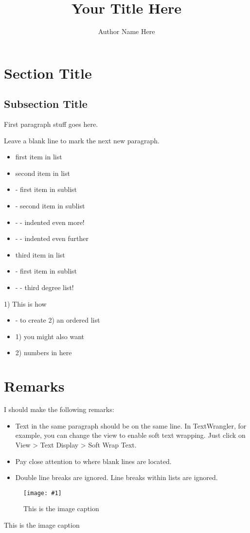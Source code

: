 \documentclass[10pt,a4paper]{article}
\title{Your Title Here}
\author{Author Name Here}
\newlength{\imgwidth}
\newcommand\scalegraphics[1]{%
    \settowidth{\imgwidth}{\texttt{[image: \#1]}}%
    \setlength{\imgwidth}{\minof{\imgwidth}{\textwidth - 75pt}}%
    \texttt{[image: \#1]}%
}
\begin{document}
\maketitle
\newpage

\tableofcontents

\newpage 
 
 

\section{Section Title}
 

\subsection{Subsection Title} 
 

First paragraph stuff goes here.
 

Leave a blank line to mark the next new paragraph.
 

\begin{itemize} 
\item first item in list
\item second item in list
\item - first item in sublist
\item - second item in sublist
\item - - indented even more!
\item - - indented even further
\item third item in list
\item - first item in sublist
\item - - third degree list!
\end{itemize} 

1) This is how
\begin{itemize} 
\item - to create
2) an ordered list
\item 1) you might also want
\item 2) numbers in here
\end{itemize} 

\section{Remarks}
 

I should make the following remarks:
 

\begin{itemize} 
\item Text in the same paragraph should be on the same line. In TextWrangler, for example, you can change the view to enable soft text wrapping. Just click on View > Text Display > Soft Wrap Text.
\item Pay close attention to where blank lines are located.
\item Double line breaks are ignored. Line breaks within lists are ignored.
\end{itemize} 


		
			\begin{figure}[h]
			\begin{center}
			\scalegraphics{graph1.png}
			\caption{This is the image caption}
			\end{center}
			\label{fig:graph1.png}
			\end{figure}
		
		This is the image caption

 
\end{document}

